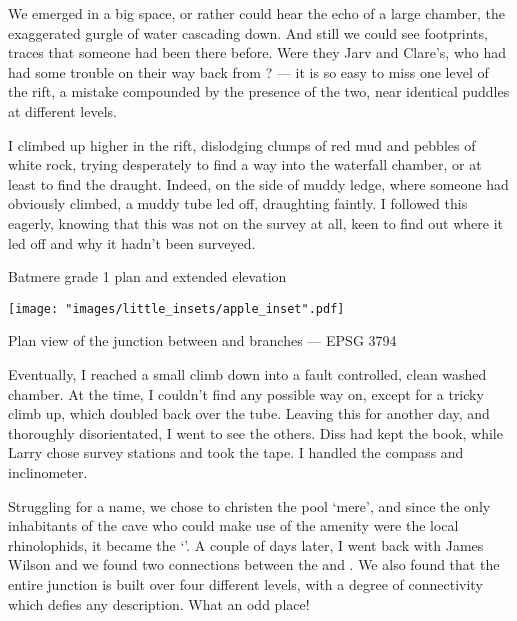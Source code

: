 	We emerged in a big space, or rather could hear the echo of a large chamber, the exaggerated gurgle of water cascading down. And still we could see footprints, traces that someone had been there before. Were they Jarv and Clare's, who had had some trouble on their way back from ? --- it is so easy to miss one level of the rift, a mistake compounded by the presence of the two, near identical puddles at different levels. 
	
I climbed up higher in the rift, dislodging clumps of red mud and pebbles of white rock, trying desperately to find a way into the waterfall chamber, or at least to find the draught. Indeed, on the side of muddy ledge, where someone had obviously climbed, a muddy tube led off, draughting faintly. I followed this eagerly, knowing that this was not on the survey at all, keen to find out where it led off and why it hadn't been surveyed. 

	
\begin{survey}[t!]
\checkoddpage \ifoddpage \forcerectofloat \else \forceversofloat \fi
 \centering
{}
\caption[Batmere plan and (grade 1)]{Batmere grade 1 plan and extended elevation }
\end{survey}

\begin{marginsurvey}
\vspace{-100pt}
	\texttt{[image: "images/little\_insets/apple\_inset".pdf]}
	\caption[Manđare junction]{Plan view of the \protect{} junction between \protect{} and \protect{} branches --- EPSG 3794}
\end{marginsurvey}
	

	Eventually, I reached a small climb down into a fault controlled, clean washed chamber. At the time, I couldn't find any possible way on, except for a tricky climb up, which doubled back over the tube. Leaving this for another day, and thoroughly disorientated, I went to see the others. Diss had kept the book, while Larry chose survey stations and took the tape. I handled the compass and inclinometer. 
	
	Struggling for a name, we chose to christen the pool `mere', and since the only inhabitants of the cave who could make use of the amenity were the local rhinolophids, it became the `'. A couple of days later, I went back with James Wilson and we found two connections between the  and . We also found that the entire  junction is built over four different levels, with a degree of connectivity which defies any description. What an odd place!

